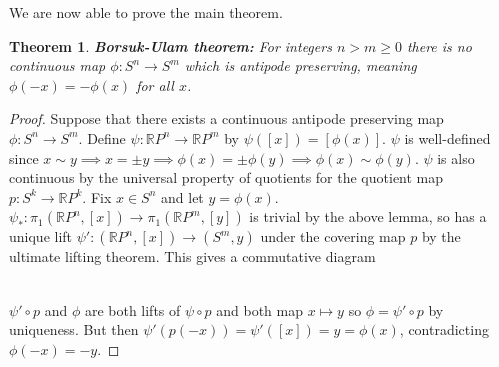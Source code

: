 \documentclass{article}
\newtheorem{theorem}{Theorem}
\begin{document}
We are now able to prove the main theorem.
\begin{theorem}
\textbf{Borsuk-Ulam theorem:} For integers $n>m\geq 0$ there is no continuous map $\phi:S^n\rightarrow S^m$ which is antipode preserving, meaning $\phi(-x)=-\phi(x)$ for all $x$.
\end{theorem}
\begin{proof}
Suppose that there exists a continuous antipode preserving map $\phi:S^n\rightarrow S^m$. Define $\psi:\mathbb{R}P^n\rightarrow \mathbb{R}P^m$ by $\psi([x])=[\phi(x)]$. $\psi$ is well-defined since $x\sim y \implies x=\pm y \implies \phi(x)=\pm\phi(y) \implies \phi(x)\sim\phi(y)$. $\psi$ is also continuous by the universal property of quotients for the quotient map $p:S^k\rightarrow \mathbb{R}P^k$.
Fix $x\in S^n$ and let $y=\phi(x)$. $\psi_*:\pi_1(\mathbb{R}P^n,[x])\rightarrow \pi_1(\mathbb{R}P^m,[y])$ is trivial by the above lemma, so has a unique lift $\psi':(\mathbb{R}P^n,[x])\rightarrow (S^m,y)$ under the covering map $p$ by the ultimate lifting theorem. This gives a commutative diagram

\\
$\psi' \circ p$ and $\phi$ are both lifts of $\psi \circ p$ and both map $x\mapsto y$ so $\phi = \psi'\circ p$ by uniqueness. But then $\psi'(p(-x))=\psi'([x])=y=\phi(x)$, contradicting $\phi(-x)=-y$.
\end{proof}
\end{document}
